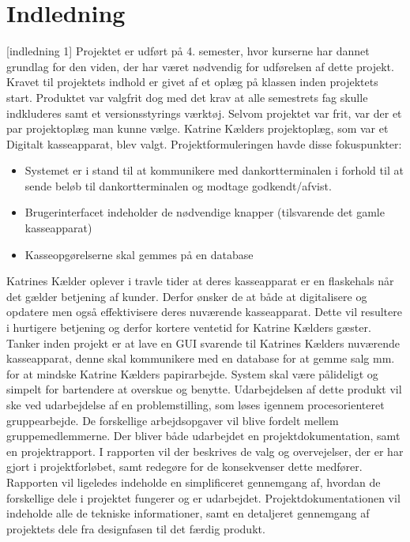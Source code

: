 \chapter{Indledning}
[indledning 1]\newline
Projektet er udført på 4. semester, hvor kurserne har dannet grundlag for den viden, der har været nødvendig for udførelsen af dette projekt. Kravet til projektets indhold er givet af et oplæg på klassen inden projektets start. Produktet var valgfrit dog med det krav at alle semestrets fag skulle indkluderes samt et versionsstyrings værktøj.
\newline
\newline
Selvom projektet var frit, var der et par projektoplæg man kunne vælge. Katrine Kælders projektoplæg, som var et Digitalt kasseapparat, blev valgt. 
\newline
\newline
Projektformuleringen havde disse fokuspunkter:

\begin{itemize}
  \item Systemet er i stand til at kommunikere med dankortterminalen i forhold til at sende beløb til dankortterminalen og modtage godkendt/afvist.
  \item Brugerinterfacet indeholder de nødvendige knapper (tilsvarende det gamle kasseapparat)
  \item Kasseopgørelserne skal gemmes på en database
\end{itemize} 
 
Katrines Kælder oplever i travle tider at deres kasseapparat er en flaskehals når det gælder betjening af kunder. Derfor ønsker de at både at digitalisere og opdatere men også effektivisere deres nuværende kasseapparat. Dette vil resultere i hurtigere betjening og derfor kortere ventetid for Katrine Kælders gæster.
\newline
\newline
Tanker inden projekt er at lave en GUI svarende til Katrines Kælders nuværende kasseapparat, denne skal kommunikere med en database for at gemme salg mm. for at mindske Katrine Kælders papirarbejde. System skal være pålideligt og simpelt for bartendere at overskue og benytte.
\newline
\newline
Udarbejdelsen af dette produkt vil ske ved udarbejdelse af en problemstilling, som løses igennem procesorienteret gruppearbejde. De forskellige arbejdsopgaver vil blive fordelt mellem gruppemedlemmerne. Der bliver både udarbejdet en projektdokumentation, samt en projektrapport.
\newline
\newline
I rapporten vil der beskrives de valg og overvejelser, der er har gjort i projektforløbet, samt redegøre for de konsekvenser dette medfører. Rapporten vil ligeledes indeholde en simplificeret gennemgang af,
hvordan de forskellige dele i projektet fungerer og er udarbejdet.
\newline
\newline
Projektdokumentationen vil indeholde alle de tekniske informationer, samt en detaljeret gennemgang af projektets
dele fra designfasen til det færdig produkt.

